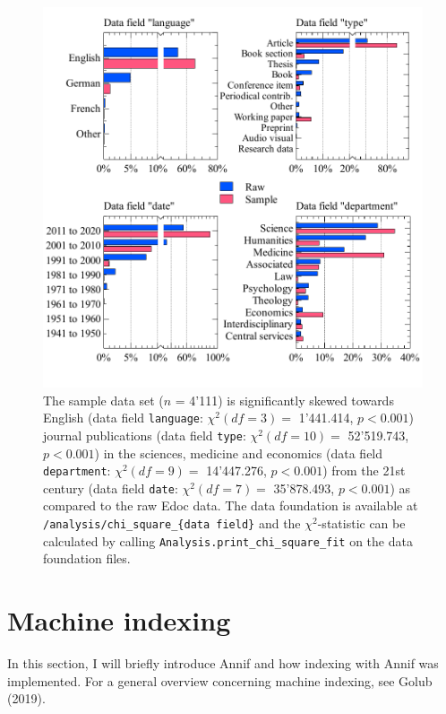 \begin{figure}
\centering
\includegraphics{images/raw_sample_analysis.pdf}
\caption{The sample data set (\(n\) = 4'111) is significantly skewed
towards English (data field \texttt{language}: \(\chi^2 (df=3) =\)
1'441.414, \(p < 0.001\)) journal publications (data field
\texttt{type}: \(\chi^2 (df=10) =\) 52'519.743, \(p < 0.001\)) in the
sciences, medicine and economics (data field \texttt{department}:
\(\chi^2 (df=9) =\) 14'447.276, \(p < 0.001\)) from the 21st century
(data field \texttt{date}: \(\chi^2 (df=7) =\) 35'878.493,
\(p < 0.001\)) as compared to the raw Edoc data. The data foundation is
available at \texttt{/analysis/chi\_square\_\{data\ field\}} and the
\(\chi^2\)-statistic can be calculated by calling
\texttt{Analysis.print\_chi\_square\_fit} on the data foundation files.}
\end{figure}

\hypertarget{machine-indexing}{%
\section{Machine indexing}\label{machine-indexing}}

In this section, I will briefly introduce Annif and how indexing with
Annif was implemented. For a general overview concerning machine
indexing, see Golub (2019).


